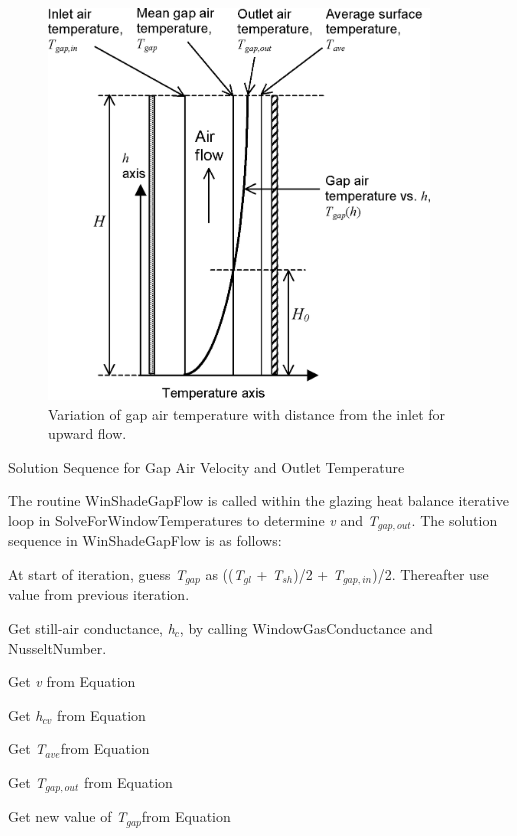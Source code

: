 \begin{figure}[hbtp] %
\centering
\includegraphics[width=0.9\textwidth, height=0.9\textheight, keepaspectratio=true]{media/image1687.png}
\caption{Variation of gap air temperature with distance from the inlet for upward flow. \protect \label{fig:variation-of-gap-air-temperature-with}}
\end{figure}

Solution Sequence for Gap Air Velocity and Outlet Temperature

The routine WinShadeGapFlow is called within the glazing heat balance iterative loop in SolveForWindowTemperatures to determine \emph{v} and \emph{T\(_{gap,out}\)}. The solution sequence in WinShadeGapFlow is as follows:

At start of iteration, guess \emph{T\(_{gap}\)} as ((\emph{T\(_{gl}\)} + \emph{T\(_{sh}\)})/2 + \emph{T\(_{gap,in}\)})/2. Thereafter use value from previous iteration.

Get still-air conductance, \emph{h\(_{c}\)}, by calling WindowGasConductance and NusseltNumber.

Get \emph{v} from Equation

Get \emph{h\(_{cv}\)} from Equation

Get \emph{T\(_{ave}\)}from Equation

Get \emph{T\(_{gap,out}\)} from Equation

Get new value of \emph{T\(_{gap}\)}from Equation


